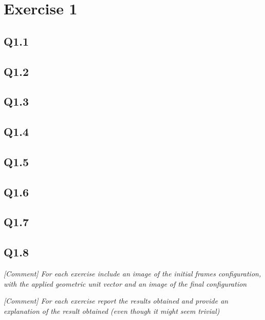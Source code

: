 \section{Exercise 1} \label{P1}
\subsection{Q1.1}
\subsection{Q1.2}
\subsection{Q1.3}
\subsection{Q1.4}
\subsection{Q1.5}
\subsection{Q1.6}
\subsection{Q1.7}
\subsection{Q1.8}

\textit{[Comment] For each exercise include an image of the initial frames configuration, with the applied geometric unit vector and an image of the final configuration} 

\textit{[Comment] For each exercise report the results obtained and provide an explanation of the result obtained (even though it might seem trivial) } 